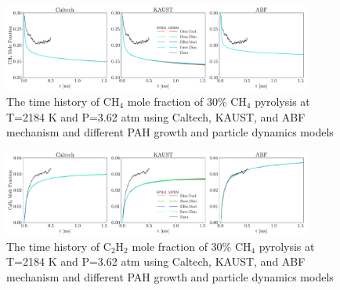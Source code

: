\begin{figure}[H]
	\centering
	\includegraphics[width=0.9\textwidth]{Figures/Results/Shocktube/Stanford/june/stsh_mech_compare_CH4.pdf}
	\caption{The time history of $\mathrm{CH_4}$ mole fraction of 30\% $\mathrm{CH_4}$ pyrolysis at T=2184 K and P=3.62 atm using Caltech, KAUST, and ABF mechanism and different PAH growth and particle dynamics models}
	\label{fig:shocktubestch4} 
\end{figure}

\begin{figure}[H]
	\centering
	\includegraphics[width=0.9\textwidth]{Figures/Results/Shocktube/Stanford/june/stsh_mech_compare_C2H2.pdf}
	\caption{The time history of $\mathrm{C_2H_2}$ mole fraction of 30\% $\mathrm{CH_4}$ pyrolysis at T=2184 K and P=3.62 atm using Caltech, KAUST, and ABF mechanism and different PAH growth and particle dynamics models}
	\label{fig:shocktubestc2h2} 
\end{figure}

